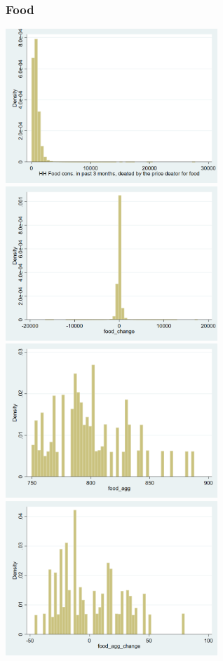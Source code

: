 \documentclass[12pt,a4paper]{article}
\begin{document}
\subsubsection*{Food}
\begin{center}
\includegraphics[width=8cm]{graphs/food.png}
\includegraphics[width=8cm]{graphs/food_change.png}\\
\includegraphics[width=8cm]{graphs/food_agg.png}
\includegraphics[width=8cm]{graphs/food_agg_change.png}\\

\end{center}
\end{document}
